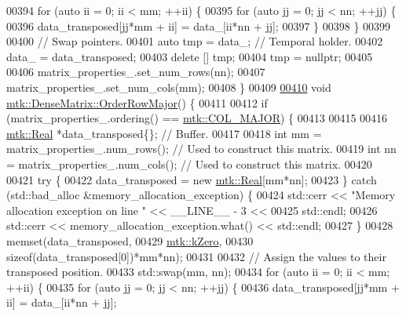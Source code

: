 \begin{DoxyCode}
00394   \textcolor{keywordflow}{for} (\textcolor{keyword}{auto} ii = 0; ii < mm; ++ii) \{
00395     \textcolor{keywordflow}{for} (\textcolor{keyword}{auto} jj = 0; jj < nn; ++jj) \{
00396       data\_transposed[jj*mm + ii] = data\_[ii*nn + jj];
00397     \}
00398   \}
00399 
00400   \textcolor{comment}{// Swap pointers.}
00401   \textcolor{keyword}{auto} tmp = data\_; \textcolor{comment}{// Temporal holder.}
00402   data\_ = data\_transposed;
00403   \textcolor{keyword}{delete} [] tmp;
00404   tmp = \textcolor{keyword}{nullptr};
00405 
00406   matrix\_properties\_.set\_num\_rows(nn);
00407   matrix\_properties\_.set\_num\_cols(mm);
00408 \}
00409 
\hypertarget{mtk__dense__matrix_8cc_source_l00410}{}\hyperlink{classmtk_1_1DenseMatrix_ac2949efba3e8278335d45418c85433e4}{00410} \textcolor{keywordtype}{void} \hyperlink{classmtk_1_1DenseMatrix_ac2949efba3e8278335d45418c85433e4}{mtk::DenseMatrix::OrderRowMajor}() \{
00411 
00412   \textcolor{keywordflow}{if} (matrix\_properties\_.ordering() == \hyperlink{namespacemtk_ga622801bd9f912d0f976c3e383f5f581ca7c11989c132253fb76b8f6b1314f7e13}{mtk::COL\_MAJOR}) \{
00413 
00415 
00416     \hyperlink{group__c01-roots_gac080bbbf5cbb5502c9f00405f894857d}{mtk::Real} *data\_transposed\{\}; \textcolor{comment}{// Buffer.}
00417 
00418     \textcolor{keywordtype}{int} mm = matrix\_properties\_.num\_rows(); \textcolor{comment}{// Used to construct this matrix.}
00419     \textcolor{keywordtype}{int} nn = matrix\_properties\_.num\_cols(); \textcolor{comment}{// Used to construct this matrix.}
00420 
00421     \textcolor{keywordflow}{try} \{
00422       data\_transposed = \textcolor{keyword}{new} \hyperlink{group__c01-roots_gac080bbbf5cbb5502c9f00405f894857d}{mtk::Real}[mm*nn];
00423     \} \textcolor{keywordflow}{catch} (std::bad\_alloc &memory\_allocation\_exception) \{
00424       std::cerr << \textcolor{stringliteral}{"Memory allocation exception on line "} << \_\_LINE\_\_ - 3 <<
00425         std::endl;
00426       std::cerr << memory\_allocation\_exception.what() << std::endl;
00427     \}
00428     memset(data\_transposed,
00429           \hyperlink{group__c01-roots_ga59a451a5fae30d59649bcda274fea271}{mtk::kZero},
00430           \textcolor{keyword}{sizeof}(data\_transposed[0])*mm*nn);
00431 
00432     \textcolor{comment}{// Assign the values to their transposed position.}
00433     std::swap(mm, nn);
00434     \textcolor{keywordflow}{for} (\textcolor{keyword}{auto} ii = 0; ii < mm; ++ii) \{
00435       \textcolor{keywordflow}{for} (\textcolor{keyword}{auto} jj = 0; jj < nn; ++jj) \{
00436         data\_transposed[jj*mm + ii] = data\_[ii*nn + jj];

\end{DoxyCode}
